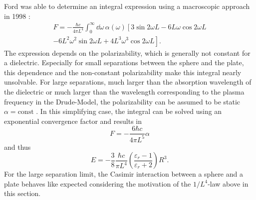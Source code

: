 Ford was able to determine an integral expression using a macroscopic approach in 1998 \cite{Ford_1998}:
\begin{multline}
  F = - \frac{\hbar c}{4 \pi L^4} \int_{0}^{\infty} \dd \omega \, \alpha(\omega) \left[3\sin 2 \omega L - 6L\omega \cos 2 \omega L \right. \\ 
  \left. - 6L^2\omega^2 \sin 2 \omega L + 4L^3\omega^3 \cos 2 \omega L\right].
\end{multline}
The expression depends on the polarizability, which is generally not constant for a dielectric. Especially for small separations between the sphere and the plate, this dependence and the non-constant polarizability make this integral nearly unsolvable.
For large separations, much larger than the absorption wavelength of the dielectric or much larger than the wavelength corresponding to the plasma frequency in the Drude-Model, the polarizability can be assumed to be static $\alpha=\mathrm{const}$ \cite{Ford_1998,Kamp_2020}. In this simplifying case, the integral can be solved using an exponential convergence factor and results in
\begin{equation}
  F = -\frac{6 \hbar c}{4 \pi L^5} \alpha
\end{equation}
and thus 
\begin{equation}\label{eq:3:casimir-sphere-plate}
  E = -\frac{3}{8}\frac{\hbar c}{\pi L^4} \left(\frac{\varepsilon_r - 1}{\varepsilon_r + 2}\right)R^3 .
\end{equation}
For the large separation limit, the Casimir interaction between a sphere and a plate behaves like expected considering the motivation of the $1/L^4$-law above in this section.

